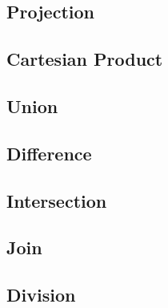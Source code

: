 % 
% 

% 
% 


\subsection{Projection}
\subsection{Cartesian Product}
\subsection{Union}
\subsection{Difference}
\subsection{Intersection}
\subsection{Join}
\subsection{Division}